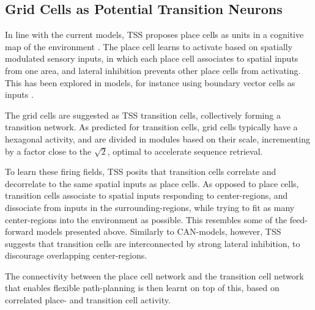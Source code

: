 \documentclass{article}
\begin{document}
    \subsection{Grid Cells as Potential Transition Neurons} \label{Grid cell as Transition cell}
    In line with the current models, TSS proposes place cells as units in a cognitive map of the environment \parencite{Waniek2018}. The place cell learns to activate based on spatially modulated sensory inputs, in which each place cell associates to spatial inputs from one area, and lateral inhibition prevents other place cells from activating. This has been explored in models, for instance using boundary vector cells as inputs \parencite{Barry2006}. 
   
    The grid cells are suggested as TSS transition cells, collectively forming a transition network. As predicted for transition cells, grid cells typically have a hexagonal activity, and are divided in modules based on their scale, incrementing by a factor close to the \(\sqrt{2}\), optimal to accelerate sequence retrieval.

    To learn these firing fields, TSS posits that transition cells correlate and decorrelate to the same spatial inputs as place cells. As opposed to place cells, transition cells associate to spatial inputs responding to center-regions, and dissociate from inputs in the surrounding-regions, while trying to fit as many center-regions into the environment as possible. This resembles some of the feed-forward models presented above. Similarly to CAN-models, however, TSS suggests that transition cells are interconnected by strong lateral inhibition, to discourage overlapping center-regions.
    
    The connectivity between the place cell network and the transition cell network that enables flexible path-planning is then learnt on top of this, based on correlated place- and transition cell activity.
\end{document}
